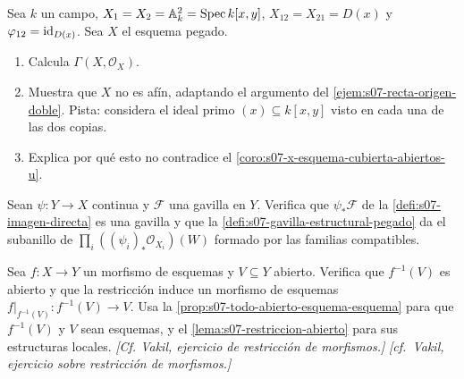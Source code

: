 \begin{ejer}
\label{ejer:s07-plano-recta-doble}
Sea $k$ un campo, $X_1=X_2=\mathbb A_k^2=\operatorname{Spec} k[x,y]$, $X_{12}=X_{21}=D(x)$ y $\varphi_{12}=\operatorname{id}_{D(x)}$. Sea $X$ el esquema pegado.
\begin{enumerate}
\item Calcula $\Gamma(X,\mathcal O_X)$.
\item Muestra que $X$ no es afín, adaptando el argumento del \cref{ejem:s07-recta-origen-doble}. Pista: considera el ideal primo $(x)\subseteq k[x,y]$ visto en cada una de las dos copias.
\item Explica por qué esto no contradice el \cref{coro:s07-x-esquema-cubierta-abiertos-u}.
\end{enumerate}
\end{ejer}

\begin{ejer}
\label{ejer:s07-imagen-directa-gavilla}
Sean $\psi\colon Y\to X$ continua y $\mathcal F$ una gavilla en $Y$. Verifica que $\psi_*\mathcal F$ de la \cref{defi:s07-imagen-directa} es una gavilla y que la \cref{defi:s07-gavilla-estructural-pegado} da el subanillo de $\prod_i((\psi_i)_*\mathcal O_{X_i})(W)$ formado por las familias compatibles.
\end{ejer}

\begin{ejer}
\label{ejer:s07-restriccion-morfismo-abierto}
Sea $f\colon X\to Y$ un morfismo de esquemas y $V\subseteq Y$ abierto. Verifica que $f^{-1}(V)$ es abierto y que la restricción induce un morfismo de esquemas $f|_{f^{-1}(V)}\colon f^{-1}(V)\to V$.
Usa la \cref{prop:s07-todo-abierto-esquema-esquema} para que $f^{-1}(V)$ y $V$ sean esquemas, y el \cref{lema:s07-restriccion-abierto} para sus estructuras locales. \emph{[Cf. Vakil, ejercicio de restricción de morfismos.]}
\emph{[cf.~Vakil, ejercicio sobre restricción de morfismos.]}
\end{ejer}
